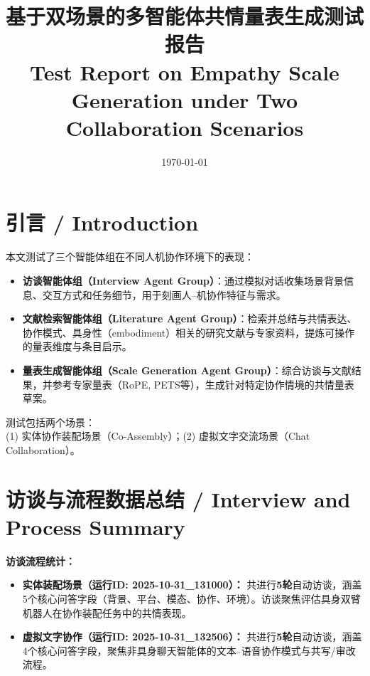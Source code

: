 \documentclass[12pt,a4paper]{article}
\begin{document}
\title{基于双场景的多智能体共情量表生成测试报告\\[4pt]
\large Test Report on Empathy Scale Generation under Two Collaboration Scenarios}
\author{}
\date{\today}
\maketitle

\section{引言 / Introduction}

本文测试了三个智能体组在不同人机协作环境下的表现：
\begin{itemize}
  \item \textbf{访谈智能体组（Interview Agent Group）}：通过模拟对话收集场景背景信息、交互方式和任务细节，用于刻画人–机协作特征与需求。
  \item \textbf{文献检索智能体组（Literature Agent Group）}：检索并总结与共情表达、协作模式、具身性（embodiment）相关的研究文献与专家资料，提炼可操作的量表维度与条目启示。
  \item \textbf{量表生成智能体组（Scale Generation Agent Group）}：综合访谈与文献结果，并参考专家量表（RoPE, PETS等），生成针对特定协作情境的共情量表草案。
\end{itemize}

测试包括两个场景：\\
(1) 实体协作装配场景（Co-Assembly）；(2) 虚拟文字交流场景（Chat Collaboration）。

\section{访谈与流程数据总结 / Interview and Process Summary}

\textbf{访谈流程统计：}
\begin{itemize}
  \item \textbf{实体装配场景（运行ID: 2025-10-31\_131000）：} 共进行\textbf{5轮}自动访谈，涵盖5个核心问答字段（背景、平台、模态、协作、环境）。访谈聚焦评估具身双臂机器人在协作装配任务中的共情表现。
  \item \textbf{虚拟文字协作（运行ID: 2025-10-31\_132506）：} 共进行\textbf{5轮}自动访谈，涵盖4个核心问答字段，聚焦非具身聊天智能体的文本–语音协作模式与共写/审改流程。
\end{itemize}
\end{document}
